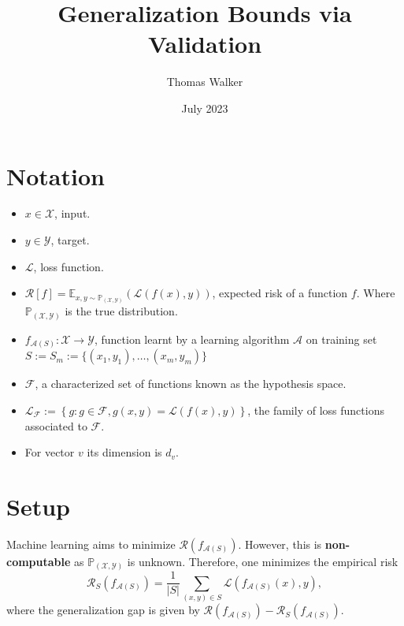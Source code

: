\documentclass[wide]{adonis}
\title{Generalization Bounds via Validation}
\author{Thomas Walker}
\affiliation{Imperial College London}
\date{July 2023}
\begin{document}
\maketitle
\section{Notation}
\begin{itemize}
    \item $x\in\mathcal{X}$, input.
    \item $y\in\mathcal{Y}$, target.
    \item $\mathcal{L}$, loss function.
    \item $\mathcal{R}[f]=\mathbb{E}_{x,y\sim\mathbb{P}_{\mathcal{(X,Y)}}}\left(\mathcal{L}(f(x),y)\right)$, expected risk of a function $f$. Where $\mathbb{P}_{\mathcal{(X,Y)}}$ is the true distribution.
    \item $f_{\mathcal{A}(S)}:\mathcal{X}\to\mathcal{Y}$, function learnt by a learning algorithm $\mathcal{A}$ on training set $S:=S_m:=\{(x_1,y_1),\dots,(x_m,y_m)\}$
    \item $\mathcal{F}$, a characterized set of functions known as the hypothesis space.
    \item $\mathcal{L_F}:=\left\{g:g\in\mathcal{F},g(x,y)=\mathcal{L}(f(x),y)\right\}$, the family of loss functions associated to $\mathcal{F}$.
    \item For vector $v$ its dimension is $d_v$.
\end{itemize}
\section{Setup}
Machine learning aims to minimize $\mathcal{R}\left(f_{\mathcal{A}(S)}\right)$. However, this is \textbf{non-computable} as $\mathbb{P}_{\mathcal{(X,Y)}}$ is unknown. Therefore, one minimizes the empirical risk
$$\mathcal{R}_{S}\left(f_{\mathcal{A}(S)}\right)=\frac{1}{\vert S\vert}\sum_{(x,y)\in S}\mathcal{L}(f_{\mathcal{A}(S)}(x),y),$$
where the generalization gap is given by $\mathcal{R}\left(f_{\mathcal{A}(S)}\right)-\mathcal{R}_S\left(f_{\mathcal{A}(S)}\right).$
\end{document}

